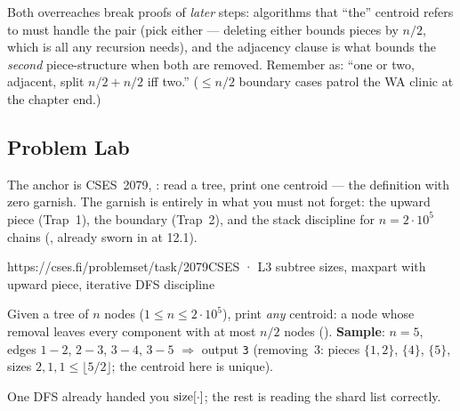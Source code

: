 \begin{warningbox}
Both overreaches break proofs of \emph{later} steps: algorithms that ``the'' centroid
refers to must handle the pair (pick either --- deleting either bounds pieces by $n/2$,
which is all any recursion needs), and the adjacency clause is what bounds the \emph{second}
piece-structure when both are removed. Remember  as: ``one or two,
adjacent, split $n/2{+}n/2$ iff two.'' \hfill($\le n/2$ boundary cases patrol the WA
clinic at the chapter end.)
\end{warningbox}

\subsection{Problem Lab}

The anchor is CSES~2079, : read a tree, print one centroid --- the
definition with zero garnish. The garnish is entirely in what you must not forget:
the upward piece (Trap~1), the boundary (Trap~2), and the stack discipline for
$n = 2\cdot 10^{5}$ chains (, already sworn in at 12.1).

  {https://cses.fi/problemset/task/2079}{CSES · L3}
  {subtree sizes, maxpart with upward piece, iterative DFS discipline}

\begin{problemstatement}
Given a tree of $n$ nodes ($1 \le n \le 2\cdot 10^5$), print \emph{any} centroid: a node
whose removal leaves every component with at most $n/2$ nodes ().
\textbf{Sample}: $n = 5$, edges $1\!-\!2$, $2\!-\!3$, $3\!-\!4$, $3\!-\!5$
$\Rightarrow$ output \texttt{3} (removing~$3$: pieces $\{1,2\}$, $\{4\}$, $\{5\}$,
sizes $2,1,1 \le \lfloor 5/2 \rfloor$; the centroid here is unique).
\end{problemstatement}

\begin{attemptgate}
One DFS already handed you $\operatorname{size}[\cdot]$; the rest is reading the shard list correctly.
\end{attemptgate}

